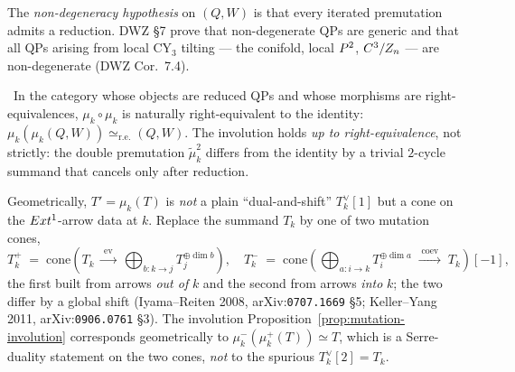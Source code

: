 The \emph{non-degeneracy hypothesis} on $(Q, W)$ is that every iterated
premutation admits a reduction. DWZ \S7 prove that non-degenerate QPs are
generic and that all QPs arising from local CY$_3$ tilting --- the conifold,
local $P^2$, $C^3/Z_n$ --- are non-degenerate (DWZ Cor.~7.4).

\begin{proposition}
\label{prop:mutation-involution}
\ClaimStatusProposition\ In the category whose objects are reduced QPs and
whose morphisms are right-equivalences, $\mu_k \circ \mu_k$ is naturally
right-equivalent to the identity: $\mu_k(\mu_k(Q, W)) \simeq_{\mathrm{r.e.}}
(Q, W)$. The involution holds \emph{up to right-equivalence}, not strictly:
the double premutation $\tilde\mu_k^2$ differs from the identity by a
trivial $2$-cycle summand that cancels only after reduction.
\end{proposition}

Geometrically, $T' = \mu_k(T)$ is \emph{not} a plain ``dual-and-shift''
$T_k^{\vee}[1]$ but a cone on the $Ext^1$-arrow data at $k$. Replace the
summand $T_k$ by one of two mutation cones,
\[
  T_k^{+} \;=\; \mathrm{cone}\!\left(T_k \;\xrightarrow{\;\mathrm{ev}\;}\;
  \bigoplus_{b \colon k \to j} T_j^{\oplus \dim b}\right),
  \quad
  T_k^{-} \;=\; \mathrm{cone}\!\left(\bigoplus_{a \colon i \to k}
  T_i^{\oplus \dim a} \;\xrightarrow{\;\mathrm{coev}\;}\; T_k\right)[-1],
\]
the first built from arrows \emph{out of} $k$ and the second from arrows
\emph{into} $k$; the two differ by a global shift (Iyama--Reiten 2008,
arXiv:\texttt{0707.1669} \S5; Keller--Yang 2011, arXiv:\texttt{0906.0761}
\S3). The involution Proposition~\ref{prop:mutation-involution} corresponds
geometrically to $\mu_k^{-}(\mu_k^{+}(T)) \simeq T$, which is a
Serre-duality statement on the two cones, \emph{not} to the spurious
$T_k^{\vee}[2] = T_k$.


